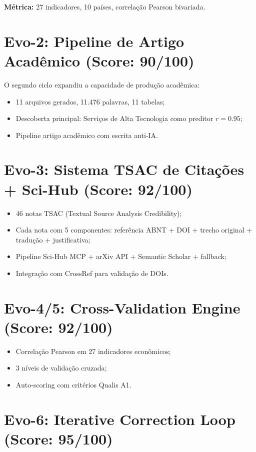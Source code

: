 \documentclass[12pt,a4paper,sumario=tradicional]{abntex2}
\begin{document}
\textbf{Métrica:} 27 indicadores, 10 países, correlação Pearson bivariada.

\section{Evo-2: Pipeline de Artigo Acadêmico (Score: 90/100)}

O segundo ciclo expandiu a capacidade de produção acadêmica:
\begin{itemize}
    \item 11 arquivos gerados, 11.476 palavras, 11 tabelas;
    \item Descoberta principal: Serviços de Alta Tecnologia como preditor $r = 0.95$;
    \item Pipeline artigo acadêmico com escrita anti-IA.
\end{itemize}

\section{Evo-3: Sistema TSAC de Citações + Sci-Hub (Score: 92/100)}

\begin{itemize}
    \item 46 notas TSAC (Textual Source Analysis Credibility);
    \item Cada nota com 5 componentes: referência ABNT + DOI + trecho original + tradução + justificativa;
    \item Pipeline Sci-Hub MCP + arXiv API + Semantic Scholar + fallback;
    \item Integração com CrossRef para validação de DOIs.
\end{itemize}

\section{Evo-4/5: Cross-Validation Engine (Score: 92/100)}

\begin{itemize}
    \item Correlação Pearson em 27 indicadores econômicos;
    \item 3 níveis de validação cruzada;
    \item Auto-scoring com critérios Qualis A1.
\end{itemize}

\section{Evo-6: Iterative Correction Loop (Score: 95/100)}
\end{document}
